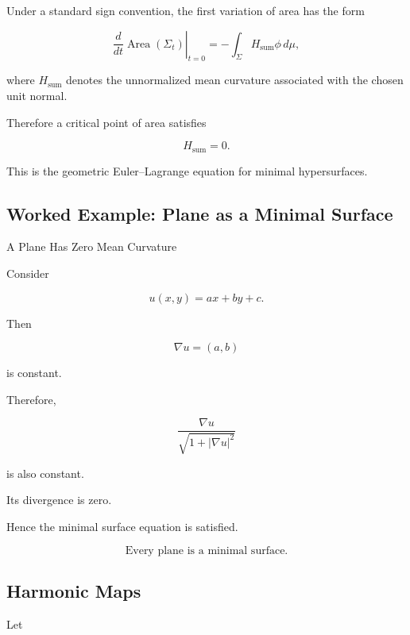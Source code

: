 Under a standard sign convention, the first variation of area has the
form

\[
\boxed{
\left.
\frac{d}{dt}
\operatorname{Area}(\Sigma_t)
\right|_{t=0}
=
-
\int_\Sigma
H_{\mathrm{sum}}\phi
\,d\mu,
}
\]

where \(H_{\mathrm{sum}}\) denotes the unnormalized mean curvature
associated with the chosen unit normal.

Therefore a critical point of area satisfies

\[
\boxed{
H_{\mathrm{sum}}=0.
}
\]

This is the geometric Euler--Lagrange equation for minimal hypersurfaces.

\subsection{Worked Example: Plane as a Minimal Surface}
\label{subsec:worked-plane-minimal}

\begin{workedexamplebox}{A Plane Has Zero Mean Curvature}

Consider

\[
u(x,y)=ax+by+c.
\]

Then

\[
\nabla u=(a,b)
\]

is constant.

Therefore,

\[
\frac{\nabla u}
{\sqrt{1+|\nabla u|^2}}
\]

is also constant.

Its divergence is zero.

Hence the minimal surface equation is satisfied.

\begin{answerbox}
\[
\boxed{
\text{Every plane is a minimal surface.}
}
\]
\end{answerbox}

\end{workedexamplebox}

\subsection{Harmonic Maps}
\label{subsec:harmonic-maps}

Let

